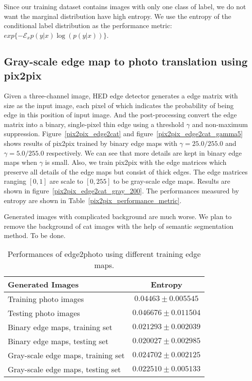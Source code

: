 Since our training dataset contains images with only one class of label, we do not want the marginal distribution have high entropy. We use the entropy of the conditional label distribution 
as the performance metric: $exp\{-\mathcal{E}_x{p(y|x)\log(p(y|x))}\}$.

\subsection{Gray-scale edge map to photo translation using pix2pix}
Given a three-channel image, HED edge detector generates a edge matrix with size as the input image, each pixel of which indicates the probability of being edge in this position of input image. And the post-processing convert the edge matrix into a binary, single-pixel thin edge using a threshold $\gamma$ and non-maximum suppression. Figure~\ref{pix2pix_edge2cat} and figure~\ref{pix2pix_edge2cat_gamma5} shows results of pix2pix trained by binary edge maps with $\gamma=25.0/255.0$ and $\gamma=5.0/255.0$ respectively. We can see that more details are kept in binary edge maps when $\gamma$ is small. 
Also, we train pix2pix with the edge matrices which preserve all details of the edge maps but consist of thick edges. The edge matrices ranging $[0,1]$ are scale to $[0,255]$ to be gray-scale edge maps. Results are shown in figure~\ref{pix2pix_edge2cat_gray_200}. The performances measured by entropy are shown in Table~\ref{pix2pix_performance_metric}.

Generated images with complicated background are much worse. We plan to remove the background of cat images with the help of semantic segmentation method. To be done.
\begin{table}[h]
    \centering
    \begin{tabular}{|l|c|}\hline
    	Generated Images&Entropy\\\hline
    	Training photo images & $0.04463\pm 0.005545$ \\
    	Testing photo images & $0.046676\pm 0.011504$ \\
    	Binary edge maps, training set & $0.021293\pm 0.002039$\\
    	Binary edge maps, testing set & $0.020027\pm 0.002985$\\
    	Gray-scale edge maps, training set & $ 0.024702\pm 0.002125$ \\
	    Gray-scale edge maps, testing set & $ 0.022510\pm 0.005133$ \\\hline
    \end{tabular}
    \caption{Performances of edge2photo using different training edge maps. }
    \label{tab:pix2pix_performance_metric}
\end{table}
